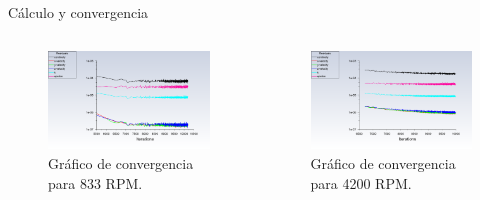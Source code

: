\begin{frame}{Cálculo y convergencia}
    \begin{columns}
        \begin{block}{}
        \begin{figure}[ht!]
            \centering
            \includegraphics[width=\linewidth]{dump/res1.png}
            \caption{Gráfico de convergencia para 833 RPM.}
        \end{figure}
    \end{block}
    \begin{block}{}
        \begin{figure}[ht!]
            \centering
            \includegraphics[width=\linewidth]{dump/res3.png}
            \caption{Gráfico de convergencia para 4200 RPM.}
        \end{figure}
    \end{block}
    \end{columns}
\end{frame}

